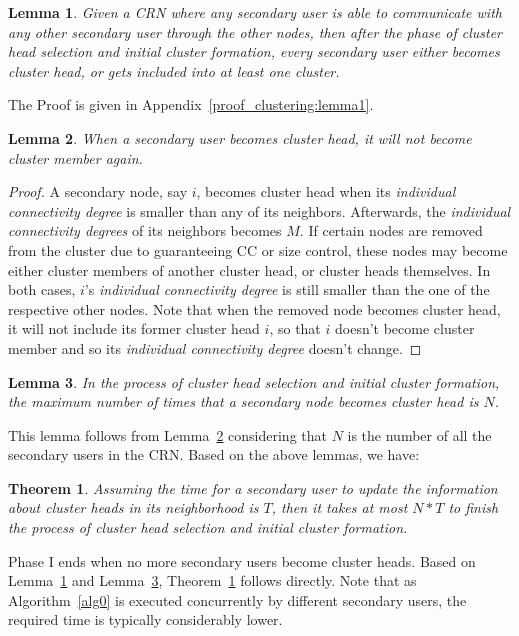 \documentclass[times]{ettauth}
\theoremstyle{mytheoremstyle}
\newtheorem{theorem}{Theorem}[section]
\theoremstyle{mytheoremstyle}
\theoremstyle{mytheoremstyle}
\newtheorem{lemma}{Lemma}[section]
\begin{document}
\begin{lemma}
\label{clustering:lemma1}
Given a CRN where any secondary user is able to communicate with any other secondary user through the other nodes, then after the phase of cluster head selection and initial cluster formation, every secondary user either becomes cluster head, or gets included into at least one cluster.
\end{lemma}
The Proof is given in Appendix~\ref{proof_clustering:lemma1}.

\begin{lemma}
\label{clustering:lemma2}
When a secondary user becomes cluster head, it will not become cluster member again.
\end{lemma}
\begin{proof}
A secondary node, say $i$, becomes cluster head when its \textit{individual connectivity degree} is smaller than any of its neighbors.
Afterwards, the \textit{individual connectivity degrees} of its neighbors becomes $M$.
If certain nodes are removed from the cluster due to guaranteeing CC or size control, these nodes may become either cluster members of another cluster head, or cluster heads themselves.
In both cases, $i$'s \textit{individual connectivity degree} is still smaller than the one of the respective other nodes.
Note that when the removed node becomes cluster head, it will not include its former cluster head $i$, so that $i$ doesn't become cluster member and so its \textit{individual connectivity degree} doesn't change.
\end{proof}


\begin{lemma}
\label{clustering:lemma3}
In the process of cluster head selection and initial cluster formation, the maximum number of times that a secondary node becomes cluster head is $N$.
\end{lemma}
This lemma follows from Lemma~\ref{clustering:lemma2} considering that $N$ is the number of all the secondary users in the CRN.
Based on the above lemmas, we have:
\begin{theorem}
\label{clustering:theorem}
Assuming the time for a secondary user to update the information about cluster heads in its neighborhood is $T$, then it takes at most $N*T $ to finish the process of cluster head selection and initial cluster formation.
\end{theorem}
Phase I ends when no more secondary users become cluster heads.
Based on Lemma~\ref{clustering:lemma1} and Lemma~\ref{clustering:lemma3}, Theorem~\ref{clustering:theorem} follows directly.
Note that as Algorithm~\ref{alg0} is executed concurrently by different secondary users, the required time is typically considerably lower.
\end{document}
